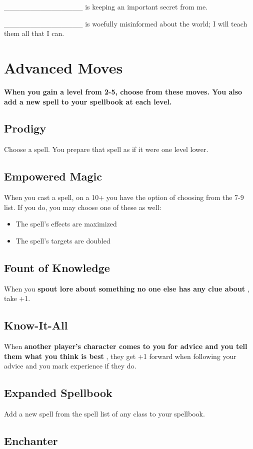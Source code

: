  \_\_\_\_\_\_\_\_\_\_\_\_\_\_\_ is keeping an important secret from me.


 \_\_\_\_\_\_\_\_\_\_\_\_\_\_\_ is woefully misinformed about the world; I will teach them all that I can.
\section*{Advanced Moves}


 {\bfseries When you gain a level from 2-5, choose from these moves. You also add a new spell to your spellbook at each level.}
\subsection{Prodigy}


 Choose a spell. You prepare that spell as if it were one level lower.
\subsection{Empowered Magic}


 When you cast a spell, on a 10+ you have the option of choosing from the 7-9 list. If you do, you may choose one of these as well:
\begin{itemize}
\item The spell's effects are maximized
\item The spell's targets are doubled

\end{itemize}
\subsection{Fount of Knowledge}


 When you \textbf{spout lore about something no one else has any clue about}
, take +1.
\subsection{Know-It-All}


 When \textbf{another player's character comes to you for advice and you tell them what you think is best}
, they get +1 forward when following your advice and you mark experience if they do.
\subsection{Expanded Spellbook}


 Add a new spell from the spell list of any class to your spellbook.
\subsection{Enchanter}


